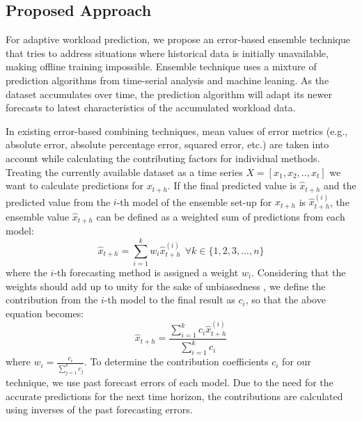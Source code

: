 \subsection{Proposed Approach}

For adaptive workload prediction, we propose an error-based ensemble technique that tries to address situations where historical data is initially unavailable, making offline training impossible. Ensemble technique uses a mixture of prediction algorithms from time-serial analysis and machine leaning. As the dataset accumulates over time, the prediction algorithm will adapt its newer forecasts to latest characteristics of the accumulated workload data.

In existing error-based combining techniques, mean values of error metrics (e.g., absolute error, absolute percentage error, squared error, etc.) are taken into account while calculating the contributing factors for individual methods. 
Treating the currently available dataset as a time series
$X=[x_{1},x_{2},.. , x_{t}]$
we want to calculate predictions for $x_{t+h}$. If the final predicted value is $\hat{x}_{t+h}$ and the predicted value from the $i$-th model of the ensemble set-up for $x_{t+h}$ is $\hat{x}_{t+h}^{(i)}$, the ensemble value $\hat{x}_{t+h}$ can be defined as a weighted sum of predictions from each model:
\begin{equation}
\hat{x}_{t+h}= \sum_{i=1}^{k}w_i \hat{x}_{t+h}^{(i)} \ \ \forall k \in \{1, 2, 3, ..., n\}
\end{equation}
where the $i$-th forecasting method is assigned a weight $w_i$. Considering that the weights should add up to unity for the sake of unbiasedness \cite{Adhikari_2012}, we define the contribution from the $i$-th model to the final result as $c_i$, so that the above equation becomes:
\begin{equation}
\hat{x}_{t+h}= \frac{\sum_{i=1}^{k}c_i \hat{x}_{t+h}^{(i)}}{\sum_{i=1}^{k}c_i}
\end{equation}
where $w_{i}= \frac{c_{i}}{\sum_{j=1}^{k}c_j}$.
To determine the contribution coefficients $c_i$ for our technique, we use past forecast errors of each model. Due to the need for the accurate predictions for the next time horizon, the contributions are calculated using inverses of the past forecasting errors.

